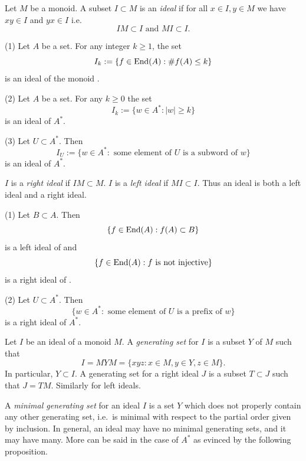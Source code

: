 \begin{defn} Let $M$ be a monoid. A subset $I\subset M$ is an \emph{ideal} if
    for all $x\in I, y\in M$ we have $xy \in I$ and $yx \in I$ i.e. \[IM
    \subset I \text{ and } MI \subset I. \]
\end{defn}

\begin{egs} (1) Let $A$ be a set. For any integer $k \ge 1$, the set \[ I_k := \{ f \in \mathrm{End}(A) : \# f(A) \le k\} \] is an ideal of the monoid .

    (2) Let $A$ be a set. For any $k\ge 0$ the set \[I_k := \{w\in A^* : |w| \ge k\}\] is an ideal of $A^*$.

    (3) Let $U \subset A^*$. Then \[I_U := \{w \in A^* : \text{ some element of } U \text{ is a subword of } w\}\] is an ideal of $A^*$.
\end{egs}

\begin{defn} $I$ is a \emph{right ideal} if $IM \subset M$. $I$ is a \emph{left
    ideal} if $MI \subset I$. Thus an ideal is both a left ideal and a right
    ideal.
\end{defn}

\begin{egs} (1) Let $B \subset {A}$. Then \[\{ f \in \mathrm{End}(A) : f(A) \subset
B\}\] is a left ideal of  and \[\{ f \in \mathrm{End}(A) : f \text{ is not
injective}\}\] is a right ideal of .

    (2) Let $U \subset A^*$. Then \[\{ w\in A^* : \text{ some element of } U
    \text{ is a prefix of } w \}\] is a right ideal of $A^*.$
\end{egs}

\begin{defns} Let $I$ be an ideal of a monoid $M$. A \emph{generating set} for
    $I$ is a subset $Y$ of $M$ such that \[I = MYM = \{xyz : x\in M, y\in Y,
    z\in M\}.\] In particular, $Y \subset I$. A generating set for a right
    ideal $J$ is a subset $T \subset J$ such that $J=TM$. Similarly for left
    ideals.

    A \emph{minimal generating set} for an ideal $I$ is a set $Y$ which does
    not properly contain any other generating set, i.e.~is minimal with respect
    to the partial order given by inclusion. In general, an ideal may have no
    minimal generating sets, and it may have many. More can be said in the case
    of $A^*$ as evinced by the following proposition.
\end{defns}

